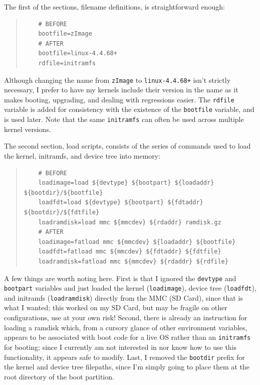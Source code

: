 \documentclass{article}
\begin{document}
The first of the sections, filename definitions, is straightforward enough:
\begin{quote}
\begin{verbatim}
	# BEFORE
	bootfile=zImage
	# AFTER
	bootfile=linux-4.4.68+
	rdfile=initramfs
\end{verbatim}
\end{quote}
Although changing the name from \texttt{zImage} to \texttt{linux-4.4.68+} isn't strictly necessary, I prefer to have my kernels include their version in the name as it makes booting, upgrading, and dealing with regressions easier.  The \texttt{rdfile} variable is added for consistency with the existence of the \texttt{bootfile} variable, and is used later.  Note that the same \texttt{initramfs} can often be used across multiple kernel versions.

The second section, load scripts, consists of the series of commands used to load the kernel, initramfs, and device tree into memory:
\begin{quote}
\begin{verbatim}
	# BEFORE
	loadimage=load ${devtype} ${bootpart} ${loadaddr} ${bootdir}/${bootfile}
	loadfdt=load ${devtype} ${bootpart} ${fdtaddr} ${bootdir}/${fdtfile}
	loadramdisk=load mmc ${mmcdev} ${rdaddr} ramdisk.gz
	# AFTER
	loadimage=fatload mmc ${mmcdev} ${loadaddr} ${bootfile}
	loadfdt=fatload mmc ${mmcdev} ${fdtaddr} ${fdtfile}
	loadramdisk=fatload mmc ${mmcdev} ${rdaddr} ${rdfile}
\end{verbatim}
\end{quote}
A few things are worth noting here.  First is that I ignored the \texttt{devtype} and \texttt{bootpart} variables and just loaded the kernel (\texttt{loadimage}), device tree (\texttt{loadfdt}), and initramfs (\texttt{loadramdisk}) directly from the MMC (SD Card), since that is what I wanted; this worked on my SD Card, but may be fragile on other configurations, use at your own risk!  Second, there is already an instruction for loading a ramdisk which, from a cursory glance of other environment variables, appears to be associated with boot code for a live OS rather than an \texttt{initramfs} for booting; since I currently am not interested in nor know how to use this functionality, it appears safe to modify.  Last, I removed the \texttt{bootdir} prefix for the kernel and device tree filepaths, since I'm simply going to place them at the root directory of the boot partition.
\end{document}
